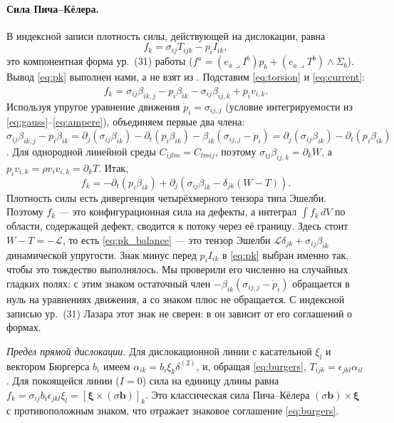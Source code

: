 \documentclass[12pt,a4paper]{article}
\begin{document}
\paragraph{Сила Пича--Кёлера.} В индексной записи плотность силы, действующей на
дислокации, равна
\begin{equation}
f_k=\sigma_{ij}T_{ijk}-p_iI_{ik},
\label{eq:pk}
\end{equation}
это компонентная форма ур.~(31) работы \cite{lazar2010}
($f^a=(e_a\lrcorner I^b)p_b+(e_a\lrcorner T^b)\wedge\Sigma_b$). Вывод \eqref{eq:pk}
выполнен нами, а не взят из \cite{lazar2010pla}. Подставим \eqref{eq:torsion} и
\eqref{eq:current}:
\[
f_k=\sigma_{ij}\beta_{ik,j}-p_i\dot\beta_{ik}-\sigma_{ij}\beta_{ij,k}+p_iv_{i,k}.
\]
Используя упругое уравнение движения $\dot p_i=\sigma_{ij,j}$ (условие
интегрируемости из \eqref{eq:gauss}--\eqref{eq:ampere}), объединяем первые два
члена:
$\sigma_{ij}\beta_{ik,j}-p_i\dot\beta_{ik}=\partial_j(\sigma_{ij}\beta_{ik})-\partial_t(p_i\beta_{ik})-\beta_{ik}(\sigma_{ij,j}-\dot p_i)=\partial_j(\sigma_{ij}\beta_{ik})-\partial_t(p_i\beta_{ik})$.
Для однородной линейной среды $C_{ijlm}=C_{lmij}$, поэтому
$\sigma_{ij}\beta_{ij,k}=\partial_k W$, а $p_iv_{i,k}=\rho v_iv_{i,k}=\partial_k T$.
Итак,
\begin{equation}
f_k=-\partial_t\!\left(p_i\beta_{ik}\right)+\partial_j\!\left(\sigma_{ij}\beta_{ik}-\delta_{jk}(W-T)\right).
\label{eq:pk_balance}
\end{equation}
Плотность силы есть дивергенция четырёхмерного тензора типа Эшелби. Поэтому $f_k$ ---
это конфигурационная сила на дефекты, а интеграл $\int f_k\,dV$ по области, содержащей
дефект, сводится к потоку через её границу. Здесь стоит $W-T=-\mathcal L$, то есть
\eqref{eq:pk_balance} --- это тензор Эшелби $\mathcal L\delta_{jk}+\sigma_{ij}\beta_{ik}$
динамической упругости. Знак минус перед $p_iI_{ik}$ в \eqref{eq:pk} выбран именно
так, чтобы это тождество выполнялось. Мы проверили его численно на случайных
гладких полях: с этим знаком остаточный член $-\beta_{ik}(\sigma_{ij,j}-\dot p_i)$
обращается в нуль на уравнениях движения, а со знаком плюс не обращается. С
индексной записью ур.~(31) Лазара этот знак не сверен: в \cite{lazar2010} он зависит
от его соглашений о формах.

\textit{Предел прямой дислокации.} Для дислокационной линии с касательной $\xi_l$ и
вектором Бюргерса $b_i$ имеем $\alpha_{ik}=b_i\xi_k\delta^{(2)}$, и, обращая
\eqref{eq:burgers}, $T_{ijk}=\epsilon_{jkl}\alpha_{il}$. Для покоящейся линии
($I=0$) сила на единицу длины равна
$f_k=\sigma_{ij}b_i\epsilon_{jkl}\xi_l=[\boldsymbol\xi\times(\sigma\mathbf b)]_k$.
Это классическая сила Пича--Кёлера $(\sigma\mathbf b)\times\boldsymbol\xi$ с
противоположным знаком, что отражает знаковое соглашение \eqref{eq:burgers}.
\end{document}
